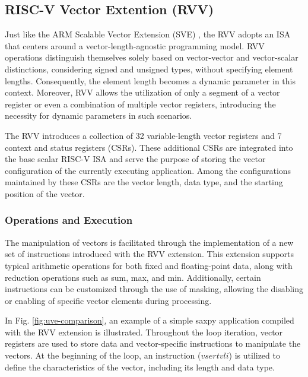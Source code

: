 \subsection{RISC-V Vector Extention (RVV)}
\label{label:rvv}

Just like the ARM Scalable Vector Extension (SVE) \cite{arm-paper}, the \acrfull{RVV} \cite{RVV} adopts an \acrfull{ISA} that centers around a vector-length-agnostic programming model. \acrshort{RVV} operations distinguish themselves solely based on vector-vector and vector-scalar distinctions, considering signed and unsigned types, without specifying element lengths. Consequently, the element length becomes a dynamic parameter in this context. Moreover, \acrshort{RVV} allows the utilization of only a segment of a vector register or even a combination of multiple vector registers, introducing the necessity for dynamic parameters in such scenarios.


The \acrlong{RVV} introduces a collection of 32 variable-length vector registers and 7 context and status registers (CSRs). These additional CSRs are integrated into the base scalar RISC-V ISA and serve the purpose of storing the vector configuration of the currently executing application. Among the configurations maintained by these CSRs are the vector length, data type, and the starting position of the vector.

\subsubsection{Operations and Execution}

The manipulation of vectors is facilitated through the implementation of a new set of instructions introduced with the \acrshort{RVV} extension. This extension supports typical arithmetic operations for both fixed and floating-point data, along with reduction operations such as sum, max, and min. Additionally, certain instructions can be customized through the use of masking, allowing the disabling or enabling of specific vector elements during processing.

In Fig. \ref{fig:uve-comparison}, an example of a simple saxpy application compiled with the RVV extension is illustrated. Throughout the loop iteration, vector registers are used to store data and vector-specific instructions to manipulate the vectors. At the beginning of the loop, an instruction ($vsertvli$) is utilized to define the characteristics of the vector, including its length and data type.






